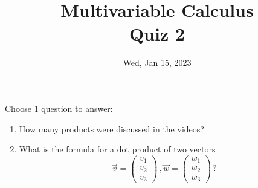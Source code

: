 \documentclass[aspectratio=169]{beamer}
\title{ Multivariable Calculus \\ Quiz 2}
\institute{Fulbright University Vietnam}
\date{Wed, Jan 15, 2023}
\begin{document}
\maketitle

\begin{frame}
    Choose 1 question to answer:
    \begin{enumerate}
        \item How many products were discussed in the videos? 
        \item What is the formula for a dot product of two vectors
            \begin{equation*}
                \vec{v} = \begin{pmatrix}
                    v_1 \\ v_2 \\ v_3
                \end{pmatrix} \,,
                \vec{w} = \begin{pmatrix}
                    w_1 \\ w_2 \\ w_3
                \end{pmatrix} \,?
            \end{equation*}
    \end{enumerate}
\end{frame}
\end{document}
